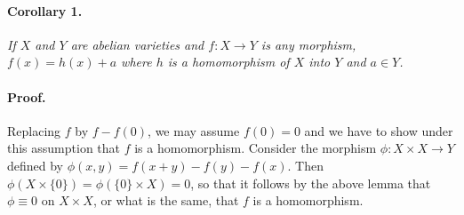 \paragraph{Corollary 1.}
\textit{If $X$ and $Y$ are abelian varieties and $f : X \to Y$ is any
morphism, $f(x) = h(x) + a$ where $h$ is a homomorphism of $X$ into $Y$ and
$a \in Y$.}

\paragraph{Proof.}
Replacing $f$ by $f - f(0)$, we may assume $f(0) = 0$ and we have to show
under this assumption that $f$ is a homomorphism. Consider the morphism
$\phi : X \times X \to Y$ defined by
$\phi(x, y) = f(x + y) - f(y) - f(x)$. Then
$\phi(X \times \{0\}) = \phi(\{0\} \times X) = 0$, so that it follows by the
above lemma that $\phi \equiv 0$ on $X \times X$, or what is the same, that
$f$ is a homomorphism.
